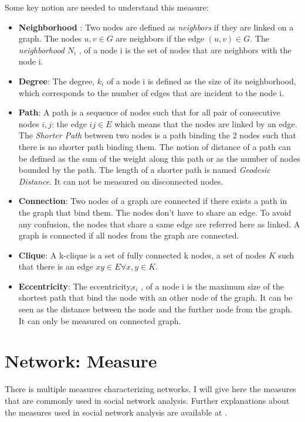 \documentclass[a4paper, 12pt]{report}
\begin{document}
Some key notion are needed to understand this measure:
\begin{itemize}
\item \textbf{Neighborhood} : Two nodes are defined as \textit{neighbors} if they are linked on a graph. The nodes $u,v \in G$ are neighbors if the edge $(u,v) \in G$. The \textit{neighborhood} $N_i$ , of a node i is the set of nodes that are neighbors with the node i.

\item \textbf{Degree}: The degree, $k_i$ of a node i is defined as the size of its neighborhood, which corresponds to the number of edges that are incident to the node i.


\item \textbf{Path}: A path is a sequence of nodes such that for all pair of consecutive nodes $i,j$: the edge $ij \in E$ which means that the nodes are linked by an edge. The \textit{Shorter Path} between two nodes is a path binding the 2 nodes such that there is no shorter path binding them. The notion of distance of a path can be defined as the sum of the weight along this path or as the number of nodes bounded by the path. The length of a shorter path is named \textit{Geodesic Distance}. It can not be measured on disconnected nodes.

\item \textbf{Connection}: Two nodes of a graph are connected if there exists a path in the graph that bind them. The nodes don't have to share an edge. To avoid any confusion, the nodes that share a same edge are referred here as linked. A graph is connected if all nodes from the graph are connected.

\item \textbf{Clique}: A k-clique is a set of fully connected k nodes, a set of nodes $K$ such that there is an edge $xy \in E \forall x,y \in K $. 

\item \textbf{Eccentricity}:  The eccentricity,$\epsilon_i$ , of a node i is the maximum size of the shortest path that bind the node with an other node of the graph. It can be seen as the distance between the node and the further node from the graph. It  can only be measured on connected graph.

\end{itemize}	
\citep{diestel}
\section{Network: Measure}
\label{measure}
There is multiple measures characterizing  networks. I will give here the measures that are commonly used in social network analysis. Further explanations about the measures used in social network analysis are available at \cite{SNA_Overview}.
\end{document}
